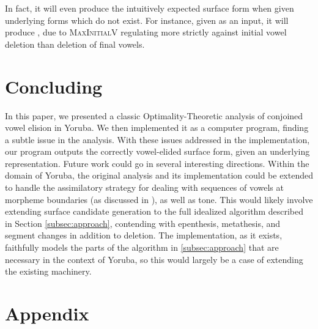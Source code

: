 \documentclass[12pt]{article}
\newcommand{\maxplusv}{\textsc{MaxInitialV}}
\begin{document}
In fact, it will even produce the intuitively expected surface
form when given underlying forms which do not exist. For
instance, given \textipa{[so-el\'u]} as an input, it will produce
, due to \maxplusv{} regulating more
strictly against initial vowel deletion than deletion of
final vowels.

\section{Concluding}

In this paper, we presented a classic Optimality-Theoretic
analysis of conjoined vowel elision in Yoruba. We then
implemented it as a computer program, finding a subtle
issue in the analysis. With these issues addressed in the
implementation, our program outputs the correctly
vowel-elided surface form, given an underlying
representation. Future work could go in several interesting
directions. Within the domain of Yoruba, the original
analysis and its implementation could be extended to handle
the assimilatory strategy for dealing with sequences of
vowels at morpheme boundaries (as discussed in
\cite{ola2002yoruba}), as well as tone. This would likely
involve extending surface candidate generation to the full
idealized algorithm described in Section
\ref{subsec:approach}, contending with epenthesis,
metathesis, and segment changes in addition to deletion.
The implementation, as it exists, faithfully models the
parts of the algorithm in \ref{subsec:approach} that are
necessary in the context of Yoruba, so this would largely
be a case of extending the existing machinery.

\pagebreak

\section{Appendix}
\end{document}
